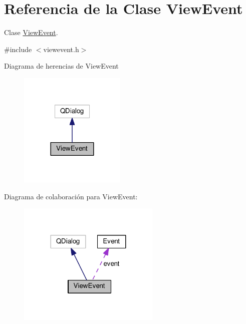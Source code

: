 \hypertarget{class_view_event}{}\section{Referencia de la Clase View\+Event}
\label{class_view_event}


Clase \hyperlink{class_view_event}{View\+Event}.  




{\ttfamily \#include $<$viewevent.\+h$>$}



Diagrama de herencias de View\+Event\nopagebreak
\begin{figure}[H]
\begin{center}
\leavevmode
\includegraphics[width=144pt]{class_view_event__inherit__graph}
\end{center}
\end{figure}


Diagrama de colaboración para View\+Event\+:\nopagebreak
\begin{figure}[H]
\begin{center}
\leavevmode
\includegraphics[width=192pt]{class_view_event__coll__graph}
\end{center}
\end{figure}
